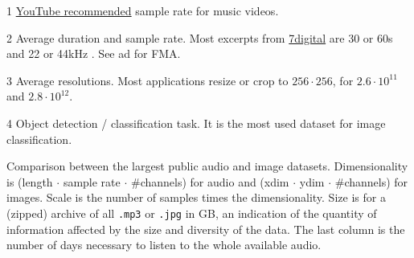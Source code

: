 \documentclass{article}
\newcommand{\todo}[1]{{\color{red} #1 }}
\begin{document}
\begin{table}[t]
\begin{threeparttable}
\begin{tablenotes}
		\item[1] \href{https://support.google.com/youtube/answer/6039860}{YouTube recommended} sample rate for music videos.
		\item[2] Average duration and sample rate. Most excerpts from \href{https://www.7digital.com}{7digital} are 30 or 60s and 22 or 44kHz \cite{msd_features}. See \todo{ad} for FMA.
		\item[3] Average resolutions. Most applications resize or crop to $256\cdot256$, for $2.6\cdot10^{11}$ and $2.8\cdot10^{12}$.
		\item[4] Object detection / classification task. It is the most used dataset for image classification.
	\end{tablenotes}
	\end{threeparttable}
	\caption{Comparison between the largest public audio and image datasets. Dimensionality is (length $\cdot$ sample rate $\cdot$ \#channels) for audio and (xdim $\cdot$ ydim $\cdot$ \#channels) for images. Scale is the number of samples times the dimensionality. Size is for a (zipped) archive of all \texttt{.mp3} or \texttt{.jpg} in GB, an indication of the quantity of information affected by the size and diversity of the data. The last column is the number of days necessary to listen to the whole available audio.}
	\label{tab:size}
\end{table}

\end{document}
